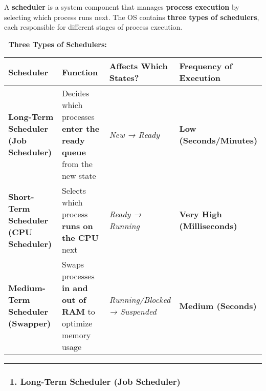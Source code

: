 \documentclass[
]{article}
\begin{document}
A \textbf{scheduler} is a system component that manages \textbf{process
execution} by selecting which process runs next. The OS contains
\textbf{three types of schedulers}, each responsible for different
stages of process execution.

📌 \textbf{Three Types of Schedulers:}

\begin{longtable}[]{@{}
  >{\raggedright\arraybackslash}p{}
  >{\raggedright\arraybackslash}p{}
  >{\raggedright\arraybackslash}p{}
  >{\raggedright\arraybackslash}p{}@{}}
\toprule\noalign{}
\begin{minipage}[b]{\linewidth}\raggedright
\textbf{Scheduler}
\end{minipage} & \begin{minipage}[b]{\linewidth}\raggedright
\textbf{Function}
\end{minipage} & \begin{minipage}[b]{\linewidth}\raggedright
\textbf{Affects Which States?}
\end{minipage} & \begin{minipage}[b]{\linewidth}\raggedright
\textbf{Frequency of Execution}
\end{minipage} \\
\midrule\noalign{}
\endhead
\bottomrule\noalign{}
\endlastfoot
\textbf{Long-Term Scheduler (Job Scheduler)} & Decides which processes
\textbf{enter the ready queue} from the new state & \emph{New → Ready} &
\textbf{Low (Seconds/Minutes)} \\
\textbf{Short-Term Scheduler (CPU Scheduler)} & Selects which process
\textbf{runs on the CPU} next & \emph{Ready → Running} & \textbf{Very
High (Milliseconds)} \\
\textbf{Medium-Term Scheduler (Swapper)} & Swaps processes \textbf{in
and out of RAM} to optimize memory usage & \emph{Running/Blocked →
Suspended} & \textbf{Medium (Seconds)} \\
\end{longtable}

\begin{center}\rule{0.5\linewidth}{0.5pt}\end{center}

\subsubsection{\texorpdfstring{\textbf{📍 1. Long-Term Scheduler (Job
Scheduler)}}{📍 1. Long-Term Scheduler (Job Scheduler)}}\label{long-term-scheduler-job-scheduler}
\end{document}
